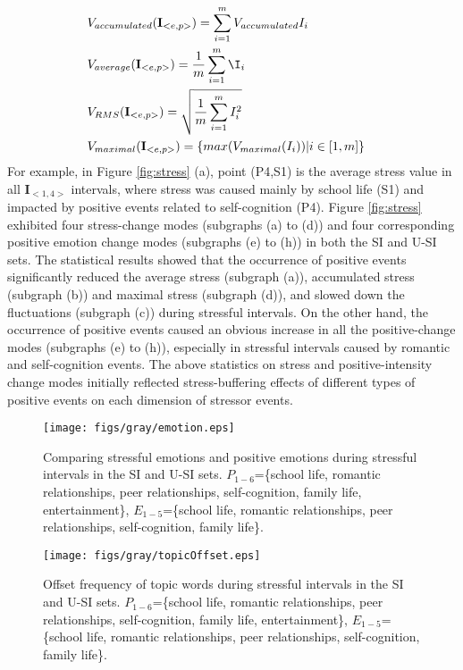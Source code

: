 \documentclass[5p,times,numbers,authoryear]{elsarticle}
\begin{document}
\begin{equation}
\begin{aligned}
& V_{accumulated}(\textbf{I}_{<e,p>})=\sum_{i=1}^m{V_{accumulated}I_i}&\\
& V_{average}(\textbf{I}_{<e,p>})=\frac{1}{m}\sum_{i=1}^m\I_i&\\
& V_{RMS}(\textbf{I}_{<e,p>})=\sqrt{\frac{1}{m}\sum_{i=1}^mI_i^2}&\\
& V_{maximal}(\textbf{I}_{<e,p>}) = \{max(V_{maximal}(I_i))|i\in[1,m]\} &
 \end{aligned}
 \end{equation}
For example, in Figure \ref{fig:stress} (a), point (P4,S1) is the average stress value in all $\textbf{I}_{<1,4>}$ intervals,
where stress was caused mainly by school life (S1) and impacted by positive events related to self-cognition (P4).
Figure \ref{fig:stress} exhibited four stress-change modes (subgraphs (a) to (d))
and four corresponding positive emotion change modes (subgraphs (e) to (h)) in both the SI and U-SI sets.
The statistical results showed that the occurrence of positive events significantly
reduced the
{average stress (subgraph (a))},
accumulated stress (subgraph (b)) and maximal stress (subgraph (d)),
and slowed down the fluctuations (subgraph (c)) during stressful intervals.
On the other hand,
the occurrence of positive events caused an obvious increase in all the positive-change modes (subgraphs (e) to (h)),
especially in stressful intervals caused by romantic and self-cognition events.
The above statistics on stress and positive-intensity change modes
initially reflected stress-buffering effects of different types of positive events on each dimension of stressor events.

\begin{figure}[h]
\centering
\texttt{[image: figs/gray/emotion.eps]}
\caption{\small{Comparing stressful emotions and positive emotions during stressful intervals in the SI and U-SI sets.
$P_{1-6}$=\{school life, romantic relationships, peer relationships, self-cognition, family life, entertainment\},
$E_{1-5}$=\{school life, romantic relationships, peer relationships, self-cognition, family life\}.
}}
\label{fig:topicAll}
\end{figure}

\begin{figure}[h]
\centering
\texttt{[image: figs/gray/topicOffset.eps]}
\caption{\small{Offset frequency of topic words during stressful intervals in the SI and U-SI sets.
$P_{1-6}$=\{school life, romantic relationships, peer relationships, self-cognition, family life, entertainment\},
$E_{1-5}$=\{school life, romantic relationships, peer relationships, self-cognition, family life\}.}}
\label{fig:stopic}
\end{figure}
\end{document}
